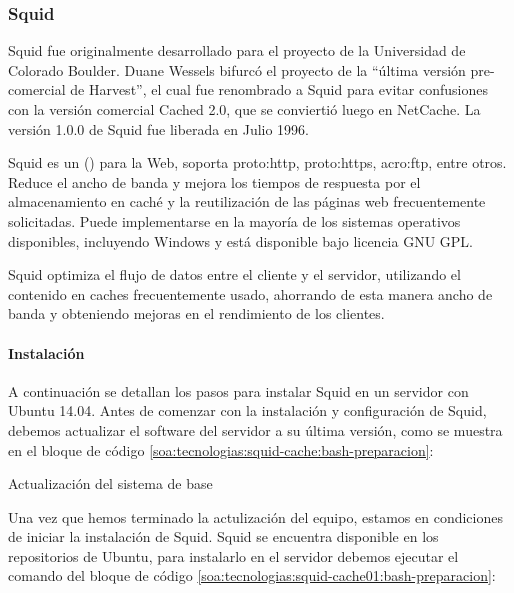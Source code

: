 \subsubsection{Squid}
\label{soa:tecnologias:squid}

Squid fue originalmente desarrollado para el proyecto  de la Universidad de Colorado Boulder.  Duane Wessels bifurcó el proyecto de la ``última versión pre-comercial de Harvest'', el cual fue renombrado a Squid para evitar confusiones con la versión comercial Cached 2.0, que se conviertió luego en NetCache.  La versión 1.0.0 de Squid fue liberada en Julio 1996.

Squid es un  () para la Web, soporta \gls{proto:http}, \gls{proto:https}, \gls{acro:ftp}, entre otros. Reduce el ancho de banda y mejora los tiempos de respuesta por el almacenamiento en caché y la reutilización de las páginas web frecuentemente solicitadas.  Puede implementarse en la mayoría de los sistemas operativos disponibles, incluyendo Windows y está disponible bajo licencia GNU GPL.

Squid optimiza el flujo de datos entre el cliente y el servidor, utilizando el contenido en caches frecuentemente usado, ahorrando de esta manera ancho de banda y obteniendo mejoras en el rendimiento de los clientes.

\paragraph{Instalación}

A continuación se detallan los pasos para instalar Squid en un servidor con Ubuntu 14.04.  Antes de comenzar con la instalación y configuración de Squid, debemos actualizar el software del servidor a su última versión, como se muestra en el bloque de código \autoref{soa:tecnologias:squid-cache:bash-preparacion}:

\begin{listing}[H]
  \caption{Actualización del sistema de base}
  \label{soa:tecnologias:squid-cache:bash-preparacion}
\end{listing}

Una vez que hemos terminado la actulización del equipo, estamos en condiciones de iniciar la instalación de Squid.  Squid se encuentra disponible en los repositorios de Ubuntu, para instalarlo en el servidor debemos ejecutar el comando del bloque de código \autoref{soa:tecnologias:squid-cache01:bash-preparacion}:

